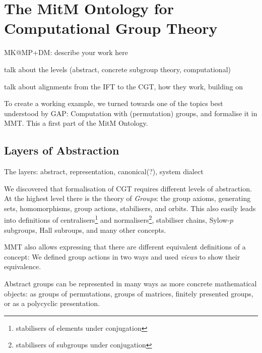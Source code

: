 \section{The MitM Ontology for Computational Group Theory}\label{sec:cgt}
\begin{todolist}{MK@MP+DM: describe your work here}
\item talk about the levels (abstract, concrete subgroup theory, computational)
\item talk about alignments from the IFT to the CGT, how they work, building
  on~\cite{MueRoYuRa:abtafs17,MueGauKal:cacfms17} 
\end{todolist}

To create a working example, we turned towards one of the topics best
understood by GAP: Computation with (permutation) groups, and formalise it in
MMT.
This a first part of the MitM Ontology.


\subsection{Layers of Abstraction}
The layers: abstract, representation, canonical(?), system dialect



We discovered that formalisation of CGT requires different levels of
abstraction. At the highest level there is the theory of \emph{Groups}: the
group axioms, generating sets, homomorphisms, group actions, stabilisers,
and orbits. This also easily leads into definitions of
centralisers\footnote{stabilisers of elements under conjugation} and
normalisers\footnote{stabilisers of subgroups under
conjugation}, stabiliser chains,  Sylow-$p$ subgroups, Hall subroups, and many
other concepts. 

MMT also allows expressing that there are different equivalent definitions of a
concept: We defined group actions in two ways and used \emph{views} to show
their equivalence.


\medskip

Abstract groups can be represented in many ways as more concrete mathematical
objects: as groups of permutations, groups of matrices, finitely presented
groups, or as a polycyclic presentation.

